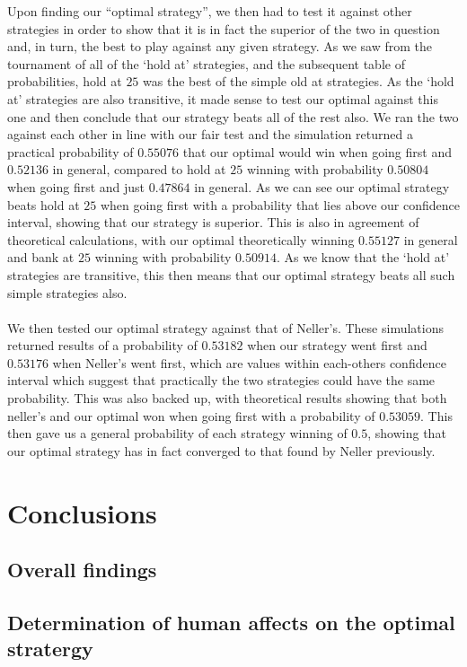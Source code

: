 \documentclass[a4paper,titlepage]{article}
\begin{document}
Upon finding our ``optimal strategy'', we then had to test it against other strategies in order to show that it is in fact the superior of the two in question and, in turn, the best to play against any given strategy. As we saw from the tournament of all of the ‘hold at’ strategies, and the subsequent table of probabilities, hold at $25$ was the best of the simple old at strategies. As the ‘hold at’ strategies are also transitive, it made sense to test our optimal against this one and then conclude that our strategy beats all of the rest also. We ran the two against each other in line with our fair test and the simulation returned a practical probability of $0.55076$ that our optimal would win when going first and $0.52136$ in general, compared to hold at $25$ winning with probability $0.50804$ when going first and just $0.47864$ in general. As we can see our optimal strategy beats hold at $25$ when going first with a probability that lies above our confidence interval, showing that our strategy is superior. This is also in agreement of theoretical calculations, with our optimal theoretically winning $0.55127$ in general and bank at $25$ winning with probability $0.50914$. As we know that the ‘hold at’ strategies are transitive, this then means that our optimal strategy beats all such simple strategies also.\\ \\
We then tested our optimal strategy against that of Neller’s. These simulations returned results of a probability of $0.53182$ when our strategy went first and $0.53176$ when Neller’s went first, which are values within each-others confidence interval which suggest that practically the two strategies could have the same probability. This was also backed up, with theoretical results showing that both neller’s and our optimal won when going first with a probability of $0.53059$. This then gave us a general probability of each strategy winning of $0.5$, showing that our optimal strategy has in fact converged to that found by Neller previously. 

\section{Conclusions}
\subsection{Overall findings}
\subsection{Determination of human affects on the optimal stratergy}
\end{document}
